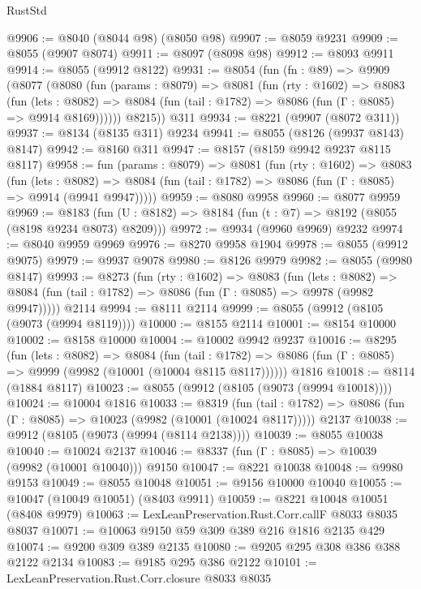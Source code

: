 \begin{lexlean}{RustStd}
\begin{coremodule}
@9906 := @8040 (@8044 @98) (@8050 @98)
@9907 := @8059 @9231
@9909 := @8055 (@9907 @8074)
@9911 := @8097 (@8098 @98)
@9912 := @8093 @9911
@9914 := @8055 (@9912 @8122)
@9931 := @8054
    (fun (fn : @89) =>
    @9909
      (@8077
        (@8080
          (fun (params : @8079) =>
          @8081
            (fun (rty : @1602) =>
            @8083
              (fun (lets : @8082) =>
              @8084 (fun (tail : @1782) => @8086 (fun (Γ : @8085) => @9914 @8169))))))
        @8215))
    @311
@9934 := @8221 (@9907 (@8072 @311))
@9937 := @8134 (@8135 @311) @9234
@9941 := @8055 (@8126 (@9937 @8143) @8147)
@9942 := @8160 @311
@9947 := @8157 (@8159 @9942 @9237 @8115 @8117)
@9958 := fun (params : @8079) =>
  @8081
    (fun (rty : @1602) =>
    @8083
      (fun (lets : @8082) =>
      @8084 (fun (tail : @1782) => @8086 (fun (Γ : @8085) => @9914 (@9941 @9947)))))
@9959 := @8080 @9958
@9960 := @8077 @9959
@9969 := @8183 (fun (U : @8182) => @8184 (fun (t : @7) => @8192 (@8055 (@8198 @9234 @8073) @8209)))
@9972 := @9934 (@9960 @9969) @9232
@9974 := @8040 @9959 @9969
@9976 := @8270 @9958 @1904
@9978 := @8055 (@9912 @9075)
@9979 := @9937 @9078
@9980 := @8126 @9979
@9982 := @8055 (@9980 @8147)
@9993 := @8273
    (fun (rty : @1602) =>
    @8083
      (fun (lets : @8082) =>
      @8084 (fun (tail : @1782) => @8086 (fun (Γ : @8085) => @9978 (@9982 @9947)))))
    @2114
@9994 := @8111 @2114
@9999 := @8055 (@9912 (@8105 (@9073 (@9994 @8119))))
@10000 := @8155 @2114
@10001 := @8154 @10000
@10002 := @8158 @10000
@10004 := @10002 @9942 @9237
@10016 := @8295
    (fun (lets : @8082) =>
    @8084
      (fun (tail : @1782) =>
      @8086 (fun (Γ : @8085) => @9999 (@9982 (@10001 (@10004 @8115 @8117))))))
    @1816
@10018 := @8114 (@1884 @8117)
@10023 := @8055 (@9912 (@8105 (@9073 (@9994 @10018))))
@10024 := @10004 @1816
@10033 := @8319
    (fun (tail : @1782) => @8086 (fun (Γ : @8085) => @10023 (@9982 (@10001 (@10024 @8117)))))
    @2137
@10038 := @9912 (@8105 (@9073 (@9994 (@8114 @2138))))
@10039 := @8055 @10038
@10040 := @10024 @2137
@10046 := @8337 (fun (Γ : @8085) => @10039 (@9982 (@10001 @10040))) @9150
@10047 := @8221 @10038
@10048 := @9980 @9153
@10049 := @8055 @10048
@10051 := @9156 @10000 @10040
@10055 := @10047 (@10049 @10051) (@8403 @9911)
@10059 := @8221 @10048 @10051 (@8408 @9979)
@10063 := LexLeanPreservation.Rust.Corr.callF @8033 @8035 @8037
@10071 := @10063 @9150 @59 @309 @389 @216 @1816 @2135 @429
@10074 := @9200 @309 @389 @2135
@10080 := @9205 @295 @308 @386 @388 @2122 @2134
@10083 := @9185 @295 @386 @2122
@10101 := LexLeanPreservation.Rust.Corr.closure
    @8033
    @8035

\end{coremodule}
\end{lexlean}
